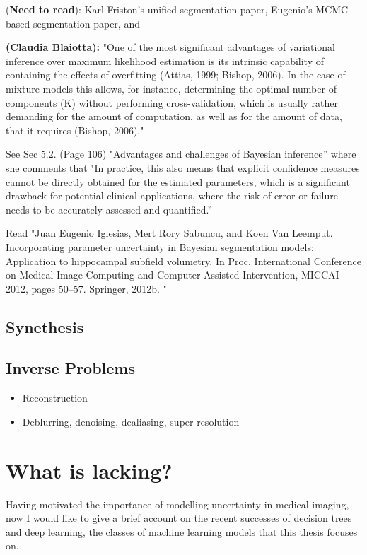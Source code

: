 (\textbf{Need to read}): Karl Friston's unified segmentation paper, Eugenio's MCMC based segmentation paper, and 

\textbf{(Claudia Blaiotta): } "One of the most significant advantages of variational inference over maximum likelihood estimation is its intrinsic capability of containing the effects of overfitting (Attias, 1999; Bishop, 2006). In the case of mixture models this allows, for instance, determining the optimal number of components (K) without performing cross-validation, which is usually rather demanding for the amount of computation, as well as for the amount of data, that it requires (Bishop, 2006)."

See Sec 5.2. (Page 106) "Advantages and challenges of Bayesian inference” where she comments that 
"In practice, this also means that explicit confidence measures cannot be directly obtained for the estimated parameters, which is a significant drawback for potential clinical applications, where the risk of error or failure needs to be accurately assessed and quantified.” 

Read "Juan Eugenio Iglesias, Mert Rory Sabuncu, and Koen Van Leemput. Incorporating parameter uncertainty in Bayesian segmentation models: Application to hippocampal subfield volumetry. In Proc. International Conference on Medical Image Computing and Computer Assisted Intervention, MICCAI 2012, pages 50–57. Springer, 2012b. "

\subsection{Synethesis}

\subsection{Inverse Problems}
\begin{itemize}
	\item Reconstruction
	\item Deblurring, denoising, dealiasing, super-resolution 
\end{itemize}


\section{What is lacking?}
Having motivated the importance of modelling uncertainty in medical imaging, now I would like to give a brief account on the recent successes of decision trees and deep learning, the classes of machine learning models that this thesis focuses on. 

